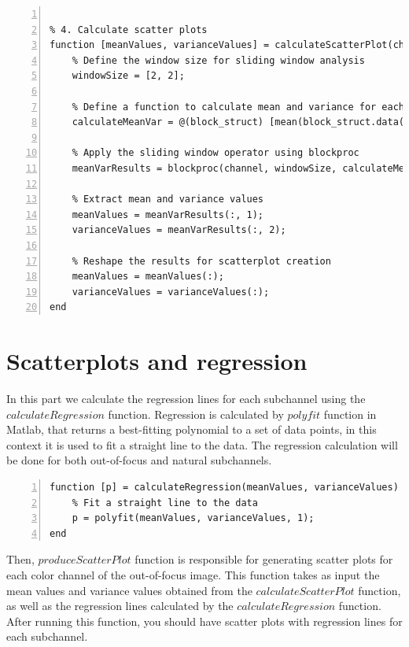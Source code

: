 \documentclass[12pt,a4paper,english
]{tunithesis}
\begin{document}
\begin{lstlisting}[style=Matlab-editor, numbers=left, basicstyle=\small]

% 4. Calculate scatter plots
function [meanValues, varianceValues] = calculateScatterPlot(channel)
    % Define the window size for sliding window analysis
    windowSize = [2, 2];

    % Define a function to calculate mean and variance for each window
    calculateMeanVar = @(block_struct) [mean(block_struct.data(:)), var(block_struct.data(:))];

    % Apply the sliding window operator using blockproc
    meanVarResults = blockproc(channel, windowSize, calculateMeanVar);

    % Extract mean and variance values
    meanValues = meanVarResults(:, 1);
    varianceValues = meanVarResults(:, 2);

    % Reshape the results for scatterplot creation
    meanValues = meanValues(:);
    varianceValues = varianceValues(:);
end
\end{lstlisting}


\section{Scatterplots and regression}
In this part we calculate the regression lines for each subchannel using the $calculateRegression$ function. Regression is calculated by $polyfit$ function in Matlab, that returns a best-fitting polynomial to a set of data points, in this context it is used to fit a straight line to the data. The regression calculation will be done for both out-of-focus and natural subchannels.
\begin{lstlisting}[style=Matlab-editor, numbers=left, basicstyle=\small]
% 5. Calculate regression lines
function [p] = calculateRegression(meanValues, varianceValues)
    % Fit a straight line to the data
    p = polyfit(meanValues, varianceValues, 1);
end
\end{lstlisting}
Then,  $produceScatterPlot$ function is responsible for generating scatter plots for each color channel of the out-of-focus image. This function takes as input the mean values and variance values obtained from the $calculateScatterPlot$ function, as well as the regression lines calculated by the $calculateRegression$ function. After running this function, you should have scatter plots with regression lines for each subchannel.
\end{document}

